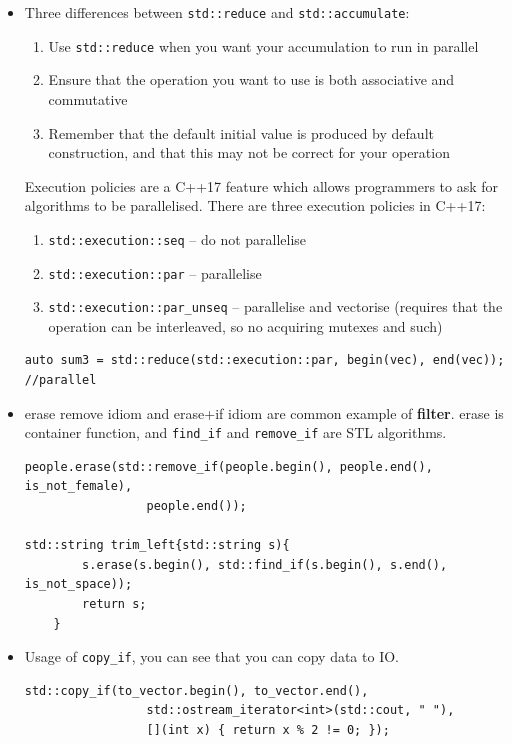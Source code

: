 \documentclass[a4paper,11pt,twoside]{book}
\begin{document}
\begin{itemize}
	\item Three differences between \texttt{std::reduce} and \texttt{std::accumulate}:
	\begin{enumerate}	
			\item Use \texttt{std::reduce} when you want your accumulation to run in parallel
			\item Ensure that the operation you want to use is both associative and commutative
			\item Remember that the default initial value is produced by default construction, and that this may not be correct for your operation
		\end{enumerate}	
	
Execution policies are a C++17 feature which allows programmers to ask for algorithms to be parallelised. There are three execution policies in C++17:
\begin{enumerate}
\item \texttt{std::execution::seq} – do not parallelise
\item \texttt{std::execution::par} – parallelise
\item \texttt{std::execution::par\_unseq} – parallelise and vectorise (requires that the operation can be interleaved, so no acquiring mutexes and such)
\end{enumerate}
	
\begin{lstlisting}
auto sum3 = std::reduce(std::execution::par, begin(vec), end(vec)); //parallel
\end{lstlisting}


	\item erase remove idiom and erase+if idiom are common example of \textbf{filter}. erase is container function, and \texttt{find\_if} and \texttt{remove\_if} are STL algorithms. 
	
\begin{lstlisting}
people.erase(std::remove_if(people.begin(), people.end(), is_not_female), 
                 people.end());

std::string trim_left{std::string s){
		s.erase(s.begin(), std::find_if(s.begin(), s.end(), is_not_space));
		return s;
	}
\end{lstlisting}

	\item Usage of \texttt{copy\_if}, you can see that you can copy data to IO.
\begin{lstlisting}
std::copy_if(to_vector.begin(), to_vector.end(),
                 std::ostream_iterator<int>(std::cout, " "),
                 [](int x) { return x % 2 != 0; });
\end{lstlisting}
	

\end{itemize}
\end{document}
